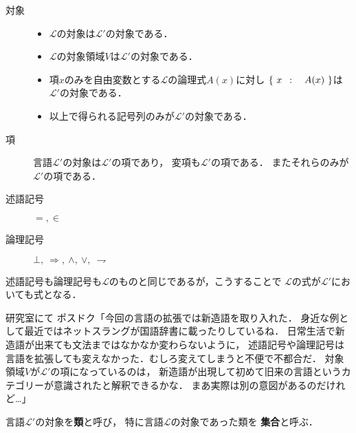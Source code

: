 	\begin{description}
		\item[対象]
			\begin{itemize}
				\item $\mathcal{L}$の対象は$\mathcal{L}'$の対象である．
				\item $\mathcal{L}$の対象領域$V$は$\mathcal{L}'$の対象である．
				\item 項$x$のみを自由変数とする$\mathcal{L}$の論理式$A(x)$に対し
					$\left\{\ x\ \, : \quad A(x)\ \right\}$は$\mathcal{L}'$の対象である．
				\item 以上で得られる記号列のみが$\mathcal{L}'$の対象である．
			\end{itemize}
			
		\item[項] 
			言語$\mathcal{L}'$の対象は$\mathcal{L}'$の項であり，
			変項も$\mathcal{L}'$の項である．
			またそれらのみが$\mathcal{L}'$の項である．
			
		\item[述語記号] $=,\in$
		\item[論理記号] $\bot,\ \Longrightarrow,\ \wedge,\ \vee,\ \rightharpoondown$
	\end{description}
	
	述語記号も論理記号も$\mathcal{L}$のものと同じであるが，こうすることで
	$\mathcal{L}$の式が$\mathcal{L}'$においても式となる．
	\begin{itembox}[l]{研究室にて}
		ポスドク「今回の言語の拡張では新造語を取り入れた．
			身近な例として最近ではネットスラングが国語辞書に載ったりしているね．
			日常生活で新造語が出来ても文法まではなかなか変わらないように，
			述語記号や論理記号は言語を拡張しても変えなかった．むしろ変えてしまうと不便で不都合だ．
			対象領域$V$が$\mathcal{L}'$の項になっているのは，
			新造語が出現して初めて旧来の言語というカテゴリーが意識されたと解釈できるかな．
			まあ実際は別の意図があるのだけれど…」
	\end{itembox}
	
	\begin{screen}
		\begin{dfn}[類・集合]
			言語$\mathcal{L}'$の対象を{\bf 類}と呼び，
			特に言語$\mathcal{L}$の対象であった類を
			{\bf 集合}と呼ぶ．
		\end{dfn}
	\end{screen}
	
